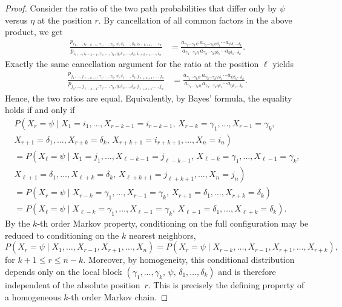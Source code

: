 \documentclass[10pt,a4paper]{amsart}
\begin{document}
\begin{proof}
Consider the ratio of the two path probabilities that differ only by $\psi$ versus $\eta$ at the
position $r$. By cancellation of all common factors in the above product, we get
\begin{align*}
\frac{
p_{i_1,\dots,i_{r-k-1},\gamma_1,\dots,\gamma_k,\psi,\delta_1,\dots,\delta_k,i_{r+k+1},\dots,i_n}
}{
p_{i_1,\dots,i_{r-k-1},\gamma_1,\dots,\gamma_k,\eta,\delta_1,\dots,\delta_k,i_{r+k+1},\dots,i_n}
}
&=
\frac{
a_{\gamma_1\cdots\gamma_k\psi}\,
a_{\gamma_2\cdots\gamma_k\psi\delta_1}\cdots
a_{\psi\delta_1\cdots\delta_k}
}{
a_{\gamma_1\cdots\gamma_k\eta}\,
a_{\gamma_2\cdots\gamma_k\eta\delta_1}\cdots
a_{\eta\delta_1\cdots\delta_k}
}.
\end{align*}
Exactly the same cancellation argument for the ratio at the position $\ell$ yields
\begin{align*}
\frac{
p_{j_1,\dots,j_{\ell-k-1},\gamma_1,\dots,\gamma_k,\psi,\delta_1,\dots,\delta_k,j_{\ell+k+1},\dots,j_n}
}{
p_{j_1,\dots,j_{\ell-k-1},\gamma_1,\dots,\gamma_k,\eta,\delta_1,\dots,\delta_k,j_{\ell+k+1},\dots,j_n}
}
&=
\frac{
a_{\gamma_1\cdots\gamma_k\psi}\,
a_{\gamma_2\cdots\gamma_k\psi\delta_1}\cdots
a_{\psi\delta_1\cdots\delta_k}
}{
a_{\gamma_1\cdots\gamma_k\eta}\,
a_{\gamma_2\cdots\gamma_k\eta\delta_1}\cdots
a_{\eta\delta_1\cdots\delta_k}
}.
\end{align*}
Hence, the two ratios are equal.
Equivalently, by Bayes' formula, the equality holds
if and only if
\begin{align*}
P\!\left(
X_r=\psi \mid 
X_1=i_1,\ldots,X_{r-k-1}=i_{r-k-1},\,
X_{r-k}=\gamma_1,\ldots,X_{r-1}=\gamma_k, \right. \\
\left.
X_{r+1}=\delta_1,\ldots,X_{r+k}=\delta_k,\,
X_{r+k+1}=i_{r+k+1},\ldots,X_n=i_n
\right)
\\
=
P\!\left(
X_\ell=\psi \mid 
X_1=j_1,\ldots,X_{\ell-k-1}=j_{\ell-k-1},\,
X_{\ell-k}=\gamma_1,\ldots,X_{\ell-1}=\gamma_k, \right. \\
\left.
X_{\ell+1}=\delta_1,\ldots,X_{\ell+k}=\delta_k,\,
X_{\ell+k+1}=j_{\ell+k+1},\ldots,X_n=j_n
\right)
\\
=
P\!\left(
X_r=\psi \mid
X_{r-k}=\gamma_1,\ldots,X_{r-1}=\gamma_k,\,
X_{r+1}=\delta_1,\ldots,X_{r+k}=\delta_k
\right)
\\
=
P\!\left(
X_\ell=\psi \mid
X_{\ell-k}=\gamma_1,\ldots,X_{\ell-1}=\gamma_k,\,
X_{\ell+1}=\delta_1,\ldots,X_{\ell+k}=\delta_k
\right).
\end{align*}
By the $k$-th order Markov property, conditioning on the full configuration may be
 reduced to conditioning on the $k$ nearest neighbors, 
\[
P(X_r=\psi \mid X_1,\ldots,X_{r-1},X_{r+1},\ldots,X_n)
=
P(X_r=\psi \mid X_{r-k},\ldots,X_{r-1},X_{r+1},\ldots,X_{r+k}),
\]
for $k+1\le r\le n-k$. Moreover, by homogeneity, this conditional distribution depends only on the local block
$(\gamma_1,\ldots,\gamma_k,\,\psi,\,\delta_1,\ldots,\delta_k)$ and is therefore independent
of the absolute position~$r$.
This is precisely the defining property of a homogeneous $k$-th order Markov chain.


\end{proof}
\end{document}
